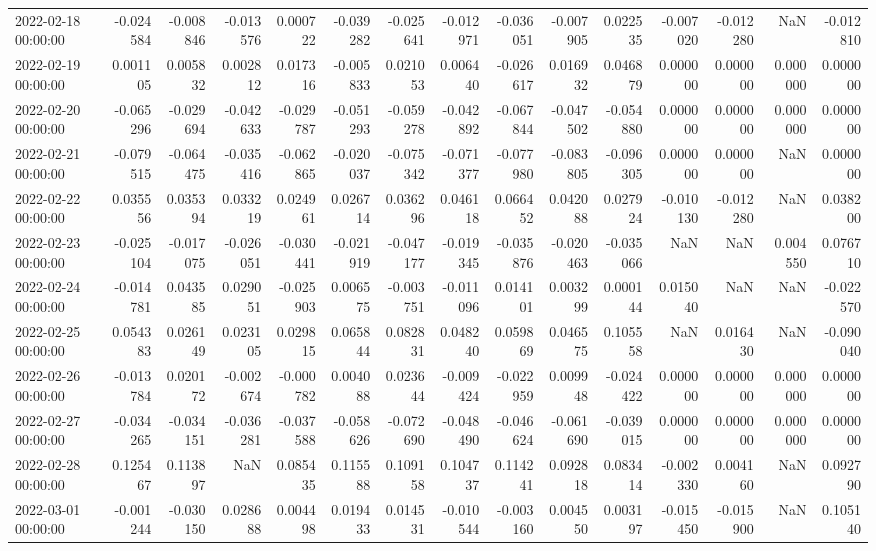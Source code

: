 \begin{tabular}{lrrrrrrrrrrrrrr}
2022-02-18 00:00:00 & -0.024584 & -0.008846 & -0.013576 & 0.000722 & -0.039282 & -0.025641 & -0.012971 & -0.036051 & -0.007905 & 0.022535 & -0.007020 & -0.012280 & NaN & -0.012810 \\
2022-02-19 00:00:00 & 0.001105 & 0.005832 & 0.002812 & 0.017316 & -0.005833 & 0.021053 & 0.006440 & -0.026617 & 0.016932 & 0.046879 & 0.000000 & 0.000000 & 0.000000 & 0.000000 \\
2022-02-20 00:00:00 & -0.065296 & -0.029694 & -0.042633 & -0.029787 & -0.051293 & -0.059278 & -0.042892 & -0.067844 & -0.047502 & -0.054880 & 0.000000 & 0.000000 & 0.000000 & 0.000000 \\
2022-02-21 00:00:00 & -0.079515 & -0.064475 & -0.035416 & -0.062865 & -0.020037 & -0.075342 & -0.071377 & -0.077980 & -0.083805 & -0.096305 & 0.000000 & 0.000000 & NaN & 0.000000 \\
2022-02-22 00:00:00 & 0.035556 & 0.035394 & 0.033219 & 0.024961 & 0.026714 & 0.036296 & 0.046118 & 0.066452 & 0.042088 & 0.027924 & -0.010130 & -0.012280 & NaN & 0.038200 \\
2022-02-23 00:00:00 & -0.025104 & -0.017075 & -0.026051 & -0.030441 & -0.021919 & -0.047177 & -0.019345 & -0.035876 & -0.020463 & -0.035066 & NaN & NaN & 0.004550 & 0.076710 \\
2022-02-24 00:00:00 & -0.014781 & 0.043585 & 0.029051 & -0.025903 & 0.006575 & -0.003751 & -0.011096 & 0.014101 & 0.003299 & 0.000144 & 0.015040 & NaN & NaN & -0.022570 \\
2022-02-25 00:00:00 & 0.054383 & 0.026149 & 0.023105 & 0.029815 & 0.065844 & 0.082831 & 0.048240 & 0.059869 & 0.046575 & 0.105558 & NaN & 0.016430 & NaN & -0.090040 \\
2022-02-26 00:00:00 & -0.013784 & 0.020172 & -0.002674 & -0.000782 & 0.004088 & 0.023644 & -0.009424 & -0.022959 & 0.009948 & -0.024422 & 0.000000 & 0.000000 & 0.000000 & 0.000000 \\
2022-02-27 00:00:00 & -0.034265 & -0.034151 & -0.036281 & -0.037588 & -0.058626 & -0.072690 & -0.048490 & -0.046624 & -0.061690 & -0.039015 & 0.000000 & 0.000000 & 0.000000 & 0.000000 \\
2022-02-28 00:00:00 & 0.125467 & 0.113897 & NaN & 0.085435 & 0.115588 & 0.109158 & 0.104737 & 0.114241 & 0.092818 & 0.083414 & -0.002330 & 0.004160 & NaN & 0.092790 \\
2022-03-01 00:00:00 & -0.001244 & -0.030150 & 0.028688 & 0.004498 & 0.019433 & 0.014531 & -0.010544 & -0.003160 & 0.004550 & 0.003197 & -0.015450 & -0.015900 & NaN & 0.105140 \\

\end{tabular}
